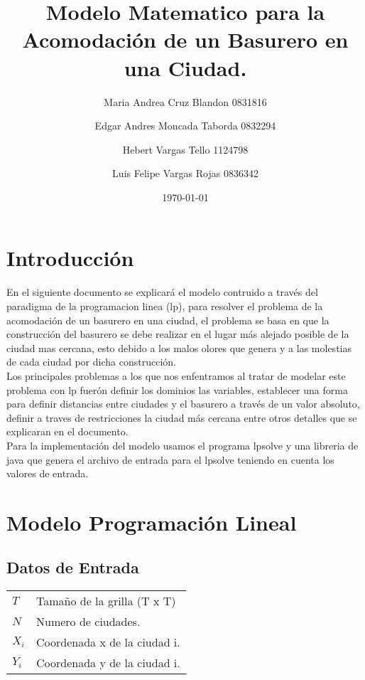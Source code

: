 \documentclass[10pt]{article}
\title{ \textbf{Modelo Matematico para la Acomodación de un Basurero en una Ciudad.}}
\author{Maria Andrea Cruz Blandon 0831816 \and Edgar Andres Moncada  Taborda 0832294 \and Hebert Vargas Tello 1124798 \and Luis Felipe Vargas Rojas 0836342  }
\date{\today}
\begin{document}
\maketitle

\tableofcontents

\section{Introducci\'on}
En el siguiente documento se explicará el modelo contruido a través del paradigma de la programacion linea (lp), para resolver el problema de la acomodación de un basurero en una ciudad, el problema se basa en que la construcci\'on del basurero se debe realizar en el lugar  m\'as alejado posible de la ciudad mas cercana, esto debido a los malos olores que genera y a las molestias de cada ciudad por dicha construcción.\\

Los principales problemas a los que nos enfentramos al tratar de modelar este problema con lp fuer\'on  definir los dominios las variables, establecer una forma para definir distancias entre ciudades y el basurero a trav\'es de un valor absoluto, definir a traves de restricciones la ciudad m\'as cercana entre otros detalles que se explicaran en el documento.\\

Para la implementación del modelo usamos el programa lpsolve y una libreria de java que genera el archivo de entrada para el lpsolve teniendo en cuenta los valores de entrada.

\section{Modelo Programaci\'on Lineal} 

\subsection{Datos de Entrada}
\begin{tabular}{l l }
$T$ & Tamaño de la grilla (T x T)\\
$N$ & Numero de ciudades.\\ 
$X_i$ & Coordenada x de la ciudad i. \\
$Y_i$ & Coordenada y de la ciudad i. \\

\end{tabular}
\end{document}
